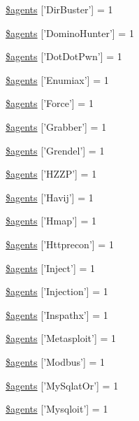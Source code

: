 \begin{DoxyCompactItemize}
\item 
\hyperlink{agents_8php_aced24c5cfc428c2fa27954a9b46fc8a7}{\$agents} \mbox{[}'Dir\-Buster'\mbox{]} = 1
\item 
\hyperlink{agents_8php_a9b73f3b42955b2780f66c9980026ea3a}{\$agents} \mbox{[}'Domino\-Hunter'\mbox{]} = 1
\item 
\hyperlink{agents_8php_a92512eef2152bc50fd8d5801454e9a74}{\$agents} \mbox{[}'Dot\-Dot\-Pwn'\mbox{]} = 1
\item 
\hyperlink{agents_8php_ad793c28ddf7c86e50d35f3c3dac200a2}{\$agents} \mbox{[}'Enumiax'\mbox{]} = 1
\item 
\hyperlink{agents_8php_a16fffac3d9ff0c07bc6e7fc2b9341a6a}{\$agents} \mbox{[}'Force'\mbox{]} = 1
\item 
\hyperlink{agents_8php_a3adfd5c4288f1ab23258d5aeadabc997}{\$agents} \mbox{[}'Grabber'\mbox{]} = 1
\item 
\hyperlink{agents_8php_abae967f09c596314df81b9d9cf675ad6}{\$agents} \mbox{[}'Grendel'\mbox{]} = 1
\item 
\hyperlink{agents_8php_adacd9d73c550e2fea90bdfbe8ac3dc8d}{\$agents} \mbox{[}'H\-Z\-Z\-P'\mbox{]} = 1
\item 
\hyperlink{agents_8php_ace103c6735950e74d94c6d96c0e9972c}{\$agents} \mbox{[}'Havij'\mbox{]} = 1
\item 
\hyperlink{agents_8php_a0d45a27d98966a60d038efe60ed24afb}{\$agents} \mbox{[}'Hmap'\mbox{]} = 1
\item 
\hyperlink{agents_8php_a92f7591da48b2ff1a9c3c3a6ad5a67ee}{\$agents} \mbox{[}'Httprecon'\mbox{]} = 1
\item 
\hyperlink{agents_8php_a92b2858a0539a49da723bf4681d42866}{\$agents} \mbox{[}'Inject'\mbox{]} = 1
\item 
\hyperlink{agents_8php_acf6d2835635ac58884c5968ed3a2cc6b}{\$agents} \mbox{[}'Injection'\mbox{]} = 1
\item 
\hyperlink{agents_8php_a8b21e7f94e4d7cb4a3297d581c8bcf6a}{\$agents} \mbox{[}'Inspathx'\mbox{]} = 1
\item 
\hyperlink{agents_8php_a96323ef65926b3182050993e76bac0af}{\$agents} \mbox{[}'Metasploit'\mbox{]} = 1
\item 
\hyperlink{agents_8php_a5dd76023063ae3fbf481e1af09cc9e1a}{\$agents} \mbox{[}'Modbus'\mbox{]} = 1
\item 
\hyperlink{agents_8php_a83504205f0eee3256ff9ee66e5ebf924}{\$agents} \mbox{[}'My\-Sqlat\-Or'\mbox{]} = 1
\item 
\hyperlink{agents_8php_a98b7d1505316546d66f994234dac3f76}{\$agents} \mbox{[}'Mysqloit'\mbox{]} = 1

\end{DoxyCompactItemize}
